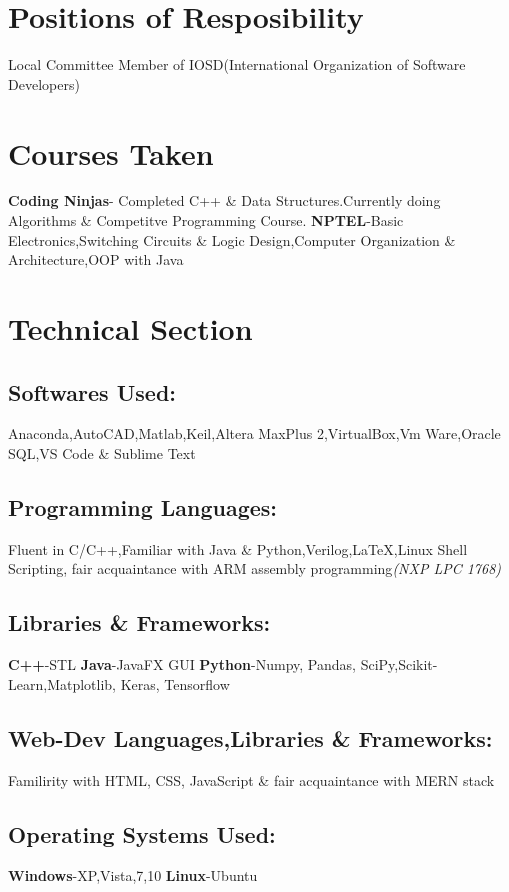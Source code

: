 \documentclass{article}
\begin{document}
\section{Positions of Resposibility}
    \textmd{Local Committee Member of IOSD(International Organization of Software Developers)}
    \section{Courses Taken} 
    \textbf{Coding Ninjas}- Completed C++ \& Data Structures.Currently doing Algorithms \& Competitve Programming Course.
    \newline
    \textbf{NPTEL}-Basic Electronics,Switching Circuits \& Logic Design,Computer Organization \& Architecture,OOP with Java
    
\section*{Technical Section}
        \subsection*{Softwares Used:}
        Anaconda,AutoCAD,Matlab,Keil,Altera MaxPlus 2,VirtualBox,Vm Ware,Oracle SQL,VS Code \& Sublime Text 
        \subsection*{Programming Languages:}
        Fluent in C/C++,Familiar with Java \& Python,Verilog,{\LaTeX},Linux Shell Scripting,
        fair acquaintance with ARM assembly programming\textit{(NXP LPC 1768)}
        \subsection*{Libraries \& Frameworks:}
            \textbf{C++}-STL    
            \textbf{Java}-JavaFX GUI
            \textbf{Python}-Numpy, Pandas, SciPy,Scikit-Learn,Matplotlib, Keras, Tensorflow    
        \subsection*{Web-Dev Languages,Libraries \& Frameworks:}
        Familirity with HTML, CSS, JavaScript \& fair acquaintance with MERN stack
        \subsection*{Operating Systems Used:}
        \textbf{Windows}-XP,Vista,7,10 
        \textbf{Linux}-Ubuntu
\end{document}
